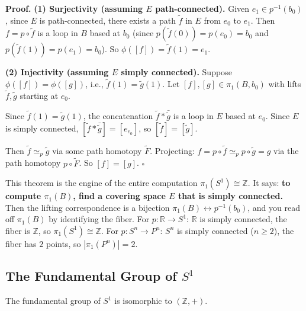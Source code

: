 \documentclass[11pt]{report}
\renewenvironment{proof}[1][Proof]{\noindent\textbf{#1.} }{\hfill$\square$\par\vspace{5pt}}
\begin{document}
\begin{proof}
\textbf{(1) Surjectivity (assuming $E$ path-connected).} Given $e_1 \in p^{-1}(b_0)$, since $E$ is path-connected, there exists a path $\tilde{f}$ in $E$ from $e_0$ to $e_1$. Then $f = p \circ \tilde{f}$ is a loop in $B$ based at $b_0$ (since $p(\tilde{f}(0)) = p(e_0) = b_0$ and $p(\tilde{f}(1)) = p(e_1) = b_0$). So $\phi([f]) = \tilde{f}(1) = e_1$.

\textbf{(2) Injectivity (assuming $E$ simply connected).} Suppose $\phi([f]) = \phi([g])$, i.e., $\tilde{f}(1) = \tilde{g}(1)$. Let $[f], [g] \in \pi_1(B, b_0)$ with lifts $\tilde{f}, \tilde{g}$ starting at $e_0$.

Since $\tilde{f}(1) = \tilde{g}(1)$, the concatenation $\tilde{f} * \bar{\tilde{g}}$ is a loop in $E$ based at $e_0$. Since $E$ is simply connected, $[\tilde{f} * \bar{\tilde{g}}] = [e_{e_0}]$, so $[\tilde{f}] = [\tilde{g}]$.

Then $\tilde{f} \simeq_p \tilde{g}$ via some path homotopy $\tilde{F}$. Projecting: $f = p \circ \tilde{f} \simeq_p p \circ \tilde{g} = g$ via the path homotopy $p \circ \tilde{F}$. So $[f] = [g]$.
\end{proof}

\begin{rembox}
This theorem is the engine of the entire computation $\pi_1(S^1) \cong \mathbb{Z}$. It says: \textbf{to compute $\pi_1(B)$, find a covering space $E$ that is simply connected.} Then the lifting correspondence is a bijection $\pi_1(B) \leftrightarrow p^{-1}(b_0)$, and you read off $\pi_1(B)$ by identifying the fiber. For $p: \mathbb{R} \to S^1$: $\mathbb{R}$ is simply connected, the fiber is $\mathbb{Z}$, so $\pi_1(S^1) \cong \mathbb{Z}$. For $p: S^n \to P^n$: $S^n$ is simply connected ($n \geq 2$), the fiber has $2$ points, so $|\pi_1(P^n)| = 2$.
\end{rembox}

\subsection{The Fundamental Group of $S^1$}

\begin{thmbox}
The fundamental group of $S^1$ is isomorphic to $(\mathbb{Z}, +)$.
\end{thmbox}
\end{document}
